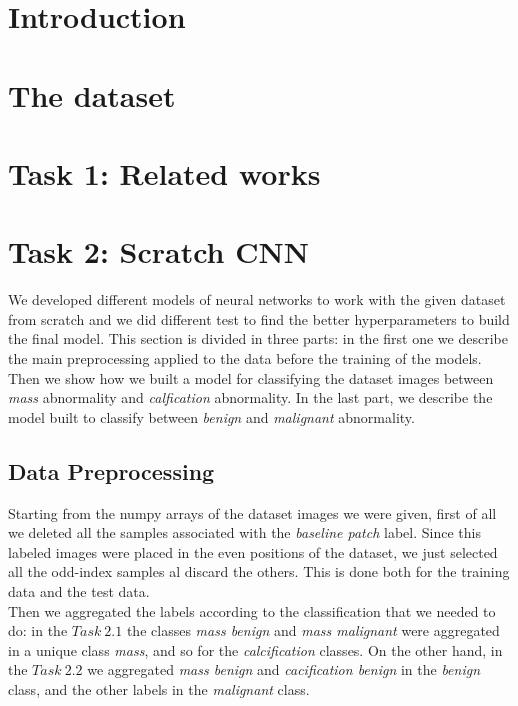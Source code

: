 \documentclass[11pt,a4paper,oneside]{article}
\begin{document}
\baselineskip 22pt


\tableofcontents\thispagestyle{empty}\clearpage

\section{Introduction}
\baselineskip 12pt

\section{The dataset}


\section{Task 1: Related works}



\section{Task 2: Scratch CNN}
We developed different models of neural networks to work with the given dataset from scratch and we did different test to find the better hyperparameters to build the final model. This section is divided in three parts: in the first one we describe the main preprocessing applied to the data before the training of the models. Then we show how we built a model for classifying the dataset images between \textit{mass} abnormality and \textit{calfication} abnormality. In the last part, we describe the model built to classify between \textit{benign} and \textit{malignant} abnormality.

\subsection{Data Preprocessing}
Starting from the numpy arrays of the dataset images we were given, first of all we deleted all the samples associated with the \textit{baseline patch} label. Since this labeled images were placed in the even positions of the dataset, we just selected all the odd-index samples al discard the others. This is done both for the training data and the test data. \\
Then we aggregated the labels according to the classification that we needed to do: in the $Task\ 2.1$ the classes \textit{mass benign} and  \textit{mass malignant} were aggregated in a unique class \textit{mass}, and so for the \textit{calcification} classes. On the other hand, in the $Task\ 2.2$ we aggregated  \textit{mass benign} and  \textit{cacification benign} in the \textit{benign} class, and the other labels in the \textit{malignant} class.
\end{document}
